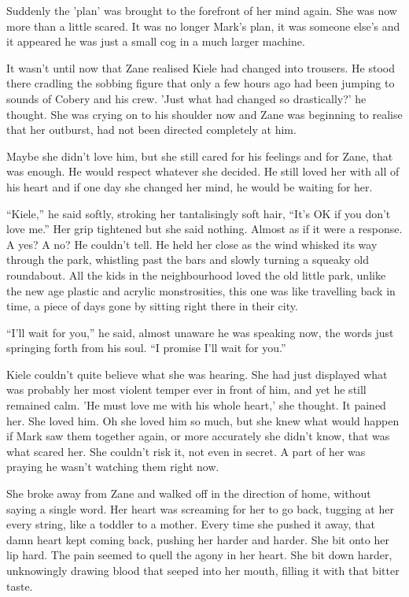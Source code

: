 Suddenly the 'plan' was brought to the forefront of her mind again.  She was now more than a little scared.  It was no longer Mark's plan, it was someone else's and it appeared he was just a small cog in a much larger machine.



\thoughtbreak



It wasn't until now that Zane realised Kiele had changed into trousers.  He stood there cradling the sobbing figure that only a few hours ago had been jumping to sounds of Cobery and his crew.  'Just what had changed so drastically?' he thought.  She was crying on to his shoulder now and Zane was beginning to realise that her outburst, had not been directed completely at him.  

Maybe she didn't love him, but she still cared for his feelings and for Zane, that was enough.  He would respect whatever she decided.  He still loved her with all of his heart and if one day she changed her mind, he would be waiting for her.

``Kiele,'' he said softly, stroking her tantalisingly soft hair, ``It's OK if you don't love me.''  Her grip tightened but she said nothing.  Almost as if it were a response.  A yes?  A no?  He couldn't tell.  He held her close as the wind whisked its way through the park, whistling past the bars and slowly turning a squeaky old roundabout.  All the kids in the neighbourhood loved the old little park, unlike the new age plastic and acrylic monstrosities, this one was like travelling back in time, a piece of days gone by sitting right there in their city.

``I'll wait for you,'' he said, almost unaware he was speaking now, the words just springing forth from his soul.  ``I promise I'll wait for you.''

Kiele couldn't quite believe what she was hearing.  She had just displayed what was probably her most violent temper ever in front of him, and yet he still remained calm.  'He must love me with his whole heart,' she thought.  It pained her.  She loved him.  Oh she loved him so much, but she knew what would happen if Mark saw them together again, or more accurately she didn't know, that was what scared her.  She couldn't risk it, not even in secret.  A part of her was praying he wasn't watching them right now.  

She broke away from Zane and walked off in the direction of home, without saying a single word.  Her heart was screaming for her to go back, tugging at her every string, like a toddler to a mother.  Every time she pushed it away, that damn heart kept coming back, pushing her harder and harder.  She bit onto her lip hard.  The pain seemed to quell the agony in her heart.  She bit down harder, unknowingly drawing blood that seeped into her mouth, filling it with that bitter taste.

